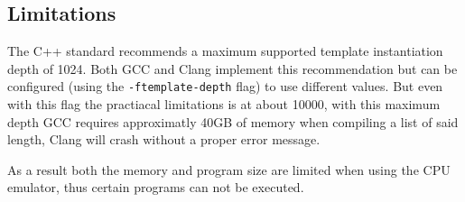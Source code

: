 \subsection{Limitations} \label{sec:limitations}
The C++ standard recommends a maximum supported template instantiation depth of 1024.
Both GCC and Clang implement this recommendation but can be configured 
(using the \texttt{-ftemplate-depth} flag) to use different values. But even with
this flag the practiacal limitations is at about 10000, with this maximum depth
GCC requires approximatly 40GB of memory when compiling a list of said length, Clang will
crash without a proper error message.

As a result both the memory and program size are limited when using the CPU emulator,
thus certain programs can not be executed.
